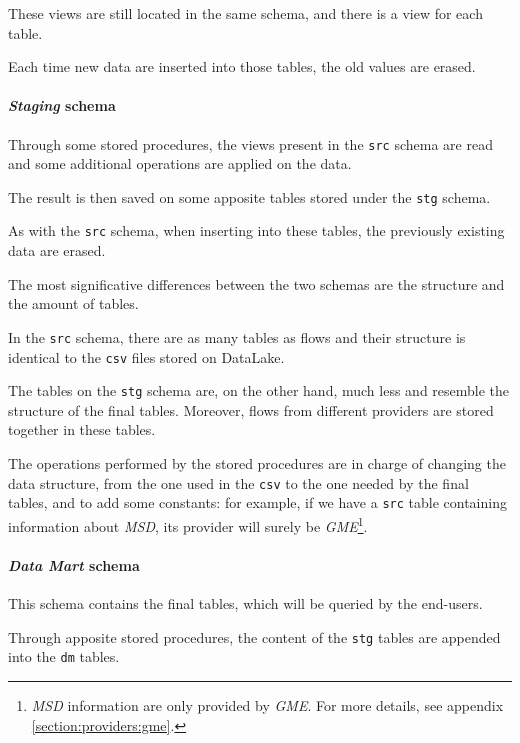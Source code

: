             These views are still located in the same schema, and there is a view for each table.
            
            Each time new data are inserted into those tables, the old values are erased.
        
        \paragraph{\textit{Staging} schema}
            Through some stored procedures, the views present in the \texttt{src} schema are read and some additional operations are applied on the data.
            
            The result is then saved on some apposite tables stored under the \texttt{stg} schema.
            
            As with the \texttt{src} schema, when inserting into these tables, the previously existing data are erased.
            
            The most significative differences between the two schemas are the structure and the amount of tables.
            
            In the \texttt{src} schema, there are as many tables as flows and their structure is identical to the \texttt{csv} files stored on DataLake.
            
            The tables on the \texttt{stg} schema are, on the other hand, much less and resemble the structure of the final tables.
            Moreover, flows from different providers are stored together in these tables.
            
            The operations performed by the stored procedures are in charge of changing the data structure, from the one used in the \texttt{csv} to the one needed by the final tables, and to add some constants: for example, if we have a \texttt{src} table containing information about \textit{MSD}, its provider will surely be \textit{GME}\footnote{
                \textit{MSD} information are only provided by \textit{GME}.
                For more details, see appendix \ref{section:providers:gme}.
            }.
            
        \paragraph{\textit{Data Mart} schema}
            This schema contains the final tables, which will be queried by the end-users.
            
            Through apposite stored procedures, the content of the \texttt{stg} tables are appended into the \texttt{dm} tables.
            
